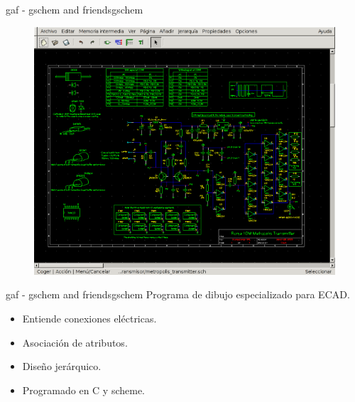 \documentclass{beamer}
\begin{document}
\begin{frame}{gaf - gschem and friends}{gschem}
  \begin{figure}[!h]
    \centering
    \includegraphics[scale=0.35]{img/gscheme.png}
  \end{figure}

\end{frame}

\begin{frame}{gaf - gschem and friends}{gschem}
  Programa de dibujo especializado para ECAD.
  \begin{itemize}
  \item Entiende conexiones eléctricas.
  \item Asociación de atributos.
  \item Diseño jerárquico.
  \item Programado en C y scheme.
  \end{itemize}
\end{frame}
\end{document}
